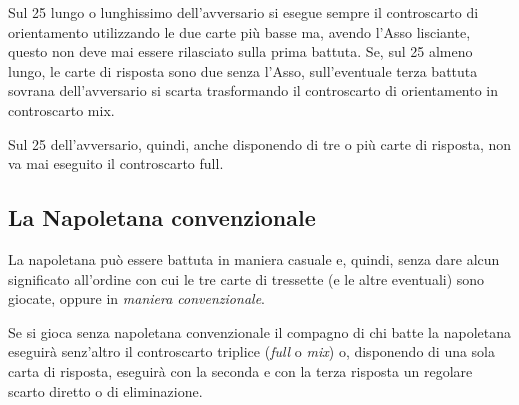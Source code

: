 \documentclass[italian,a4paper]{article}
\begin{document}
Sul 25 lungo o lunghissimo dell'avversario si esegue sempre il controscarto di orientamento utilizzando le due carte più basse ma, avendo l'Asso lisciante, questo non deve mai essere rilasciato sulla prima battuta.
Se, sul 25 almeno lungo, le carte di risposta sono due senza l'Asso, sull'eventuale terza battuta sovrana dell'avversario si scarta trasformando il controscarto di orientamento in controscarto mix.
 
Sul 25 dell'avversario, quindi, anche disponendo di tre o più carte di risposta,  non va mai eseguito il controscarto full.
\subsection{La Napoletana convenzionale}
La napoletana può essere battuta in maniera casuale e, quindi, senza dare
alcun significato all'ordine con cui le tre carte  di tressette (e le altre
eventuali) sono giocate, oppure in \emph{maniera convenzionale}.
 
Se si gioca senza napoletana convenzionale il compagno di chi batte la
napoletana eseguirà senz'altro il controscarto triplice
(\emph{full} o \emph{mix}) o, disponendo di una sola carta di risposta, eseguirà con la seconda e con la terza risposta un regolare scarto diretto o di eliminazione.
 
\end{document}
